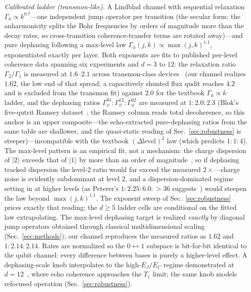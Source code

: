 \documentclass[aps,pra,reprint,superscriptaddress,nofootinbib,floatfix]{revtex4-2}
\begin{document}
\emph{Calibrated ladder (transmon-like).} A Lindblad channel with
sequential relaxation $\Gamma_k \propto k^{0.7}$---one independent
jump operator per transition (the secular form: the anharmonicity
splits the Bohr frequencies by orders of magnitude more than the
decay rates, so cross-transition coherence-transfer terms are rotated
away)---and pure dephasing
following a max-level law $\Gamma_\phi(j,k)\propto\max(j,k)^{1.1}$,
exponentiated exactly per layer. Both exponents are fits to published
per-level coherence data spanning six experiments and $d=3$ to $12$: the
relaxation ratio $\Gamma_2/\Gamma_1$ is measured at $1.6$--$2.1$
across transmon-class
devices~\cite{goss2022,blok2021,tripathi2025,peterer2015,wang2025}
(our channel realizes $1.62$, the low end of that spread; a
capacitively shunted flux qudit reaches $4.2$~\cite{yurtalan2020} and
is excluded from the transmon fit) against $2.0$ for the
textbook $\Gamma_k\propto k$ ladder, and the dephasing ratios
$\Gamma_\phi^{01}:\Gamma_\phi^{12}:\Gamma_\phi^{02}$ are measured at
$1:2.0:2.3$ (Blok's five-qutrit Ramsey
dataset~\cite{blok2021}; the Ramsey column reads total decoherence,
so this anchor is an upper composite---the echo-extracted pure-dephasing
ratios from the same table are shallower, and the quasi-static
reading of Sec.~\ref{sec:robustness} is steeper)---incompatible with
the textbook $(\Delta\mathrm{level})^2$
law (which predicts $1:1:4$). The max-level pattern is an empirical
fit, not a mechanism: the charge dispersion of $\lvert2\rangle$
exceeds that of $\lvert1\rangle$ by more than an order of
magnitude~\cite{blok2021}, so if dephasing tracked dispersion the
level-2 ratio would far exceed the measured $2\times$---charge noise
is evidently subdominant at level 2, and a dispersion-dominated
regime setting in at higher levels (as Peterer's
$1:2.25:6.0:{>}36$ suggests~\cite{peterer2015}) would steepen the
law beyond $\max(j,k)^{1.1}$. The exponent sweep of
Sec.~\ref{sec:robustness} prices exactly that reading; the $d\ge5$
ladder cells are conditional on the fitted law extrapolating. The max-level dephasing target is realized
\emph{exactly} by diagonal jump operators obtained through classical
multidimensional scaling (Sec.~\ref{sec:methods}); our channel
reproduces the measured ratios as $1.62$ and $1:2.14:2.14$. Rates are
normalized so the $0{\leftrightarrow}1$ subspace is bit-for-bit
identical to the qubit channel: every difference between bases is
purely a higher-level effect. A dephasing-scale knob interpolates to the
high-$E_J/E_C$ regime demonstrated at
$d=12$~\cite{wang2025}, where echo coherence approaches the $T_1$
limit; the same knob models refocused operation
(Sec.~\ref{sec:robustness}).
\end{document}
